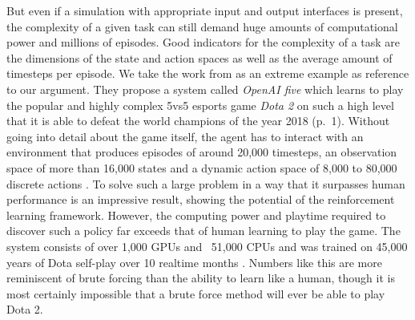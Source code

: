 \par
But even if a simulation with appropriate input and output interfaces is present, the complexity of a given task can still demand huge amounts of computational power and millions of episodes. Good indicators for the complexity of a task are the dimensions of the state and action spaces as well as the average amount of timesteps per episode. We take the work from \cite{berner2019dota} as an extreme example as reference to our argument. They propose a system called \textit{OpenAI five} which learns to play the popular and highly complex 5vs5 esports game \textit{Dota 2} on such a high level that it is able to defeat the world champions of the year 2018 (p.~1). Without going into detail about the game itself, the agent has to interact with an environment that produces episodes of around 20,000 timesteps, an observation space of more than 16,000 states and a dynamic action space of 8,000 to 80,000 discrete actions \cite[p.~3]{berner2019dota}. To solve such a large problem in a way that it surpasses human performance is an impressive result, showing the potential of the reinforcement learning framework. However, the computing power and playtime required to discover such a policy far exceeds that of human learning to play the game. The system consists of over 1,000 GPUs and ~51,000 CPUs \cite[p.~3]{berner2019dota} and was trained on 45,000 years of Dota self-play over 10 realtime months \cite[]{OpenAI_dota}.
Numbers like this are more reminiscent of brute forcing than the ability to learn like a human, though it is most certainly impossible that a brute force method will ever be able to play Dota 2.